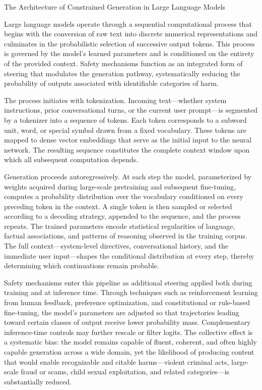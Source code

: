 The Architecture of Constrained Generation in Large Language Models

Large language models operate through a sequential computational process that begins with the conversion of raw text into discrete numerical representations and culminates in the probabilistic selection of successive output tokens. This process is governed by the model’s learned parameters and is conditioned on the entirety of the provided context. Safety mechanisms function as an integrated form of steering that modulates the generation pathway, systematically reducing the probability of outputs associated with identifiable categories of harm.

The process initiates with tokenization. Incoming text—whether system instructions, prior conversational turns, or the current user prompt—is segmented by a tokenizer into a sequence of tokens. Each token corresponds to a subword unit, word, or special symbol drawn from a fixed vocabulary. These tokens are mapped to dense vector embeddings that serve as the initial input to the neural network. The resulting sequence constitutes the complete context window upon which all subsequent computation depends.

Generation proceeds autoregressively. At each step the model, parameterized by weights acquired during large-scale pretraining and subsequent fine-tuning, computes a probability distribution over the vocabulary conditioned on every preceding token in the context. A single token is then sampled or selected according to a decoding strategy, appended to the sequence, and the process repeats. The trained parameters encode statistical regularities of language, factual associations, and patterns of reasoning observed in the training corpus. The full context—system-level directives, conversational history, and the immediate user input—shapes the conditional distribution at every step, thereby determining which continuations remain probable.

Safety mechanisms enter this pipeline as additional steering applied both during training and at inference time. Through techniques such as reinforcement learning from human feedback, preference optimization, and constitutional or rule-based fine-tuning, the model’s parameters are adjusted so that trajectories leading toward certain classes of output receive lower probability mass. Complementary inference-time controls may further rescale or filter logits. The collective effect is a systematic bias: the model remains capable of fluent, coherent, and often highly capable generation across a wide domain, yet the likelihood of producing content that would enable recognizable and citable harms—violent criminal acts, large-scale fraud or scams, child sexual exploitation, and related categories—is substantially reduced.

